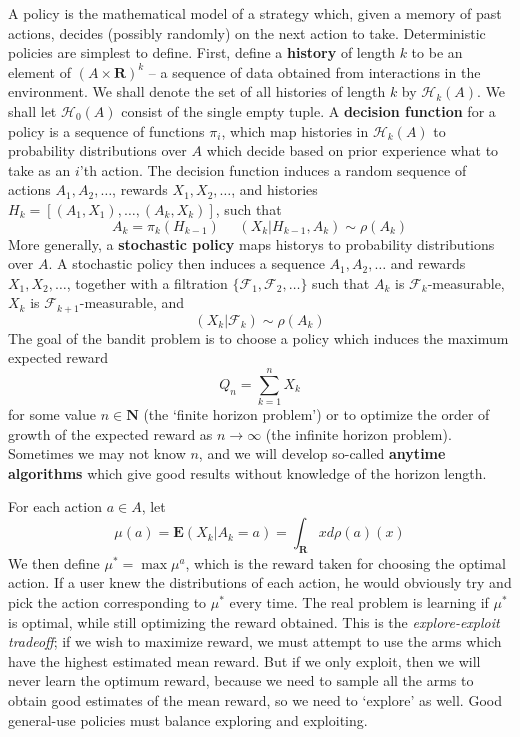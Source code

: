A policy is the mathematical model of a strategy which, given a memory of past actions, decides (possibly randomly) on the next action to take. Deterministic policies are simplest to define. First, define a {\bf history} of length $k$ to be an element of $(A \times \mathbf{R})^k$ -- a sequence of data obtained from interactions in the environment. We shall denote the set of all histories of length $k$ by $\mathcal{H}_k(A)$. We shall let $\mathcal{H}_0(A)$ consist of the single empty tuple. A {\bf decision function} for a policy is a sequence of functions $\pi_i$, which map histories in $\mathcal{H}_k(A)$ to probability distributions over $A$ which decide based on prior experience what to take as an $i$'th action. The decision function induces a random sequence of actions $A_1, A_2, \dots$, rewards $X_1, X_2, \dots$, and histories $H_k = [(A_1,X_1), \dots, (A_k,X_k)]$, such that
%
\[ A_k = \pi_k(H_{k-1})\ \ \ \ \ \ (X_k | H_{k-1}, A_k) \sim \rho(A_k) \]
%
More generally, a {\bf stochastic policy} maps historys to probability distributions over $A$. A stochastic policy then induces a sequence $A_1, A_2, \dots$ and rewards $X_1, X_2, \dots$, together with a filtration $\{ \mathcal{F}_1, \mathcal{F}_2, \dots \}$ such that $A_k$ is $\mathcal{F}_k$-measurable, $X_k$ is $\mathcal{F}_{k+1}$-measurable, and
%
\[ (X_k | \mathcal{F}_k) \sim \rho(A_k) \]
%
The goal of the bandit problem is to choose a policy which induces the maximum expected reward
%
\[ Q_n = \sum_{k=1}^n X_k \]
%
for some value $n \in \mathbf{N}$ (the `finite horizon problem') or to optimize the order of growth of the expected reward as $n \to \infty$ (the infinite horizon problem). Sometimes we may not know $n$, and we will develop so-called {\bf anytime algorithms} which give good results without knowledge of the horizon length.

For each action $a \in A$, let
%
\[ \mu(a) = \mathbf{E}(X_k | A_k = a) = \int_\mathbf{R} x d \rho(a)(x) \]
%
We then define $\mu^* = \max \mu^a$, which is the reward taken for choosing the optimal action. If a user knew the distributions of each action, he would obviously try and pick the action corresponding to $\mu^*$ every time. The real problem is learning if $\mu^*$ is optimal, while still optimizing the reward obtained. This is the {\it explore-exploit tradeoff}; if we wish to maximize reward, we must attempt to use the arms which have the highest estimated mean reward. But if we only exploit, then we will never learn the optimum reward, because we need to sample all the arms to obtain good estimates of the mean reward, so we need to `explore' as well. Good general-use policies must balance exploring and exploiting.

